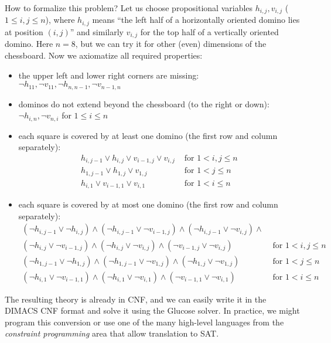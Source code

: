 How to formalize this problem? Let us choose propositional variables $h_{i,j}, v_{i,j}$ ($1 \leq i,j \leq n$), where $h_{i,j}$ means ``the left half of a horizontally oriented domino lies at position $(i,j)$'' and similarly $v_{i,j}$ for the top half of a vertically oriented domino. Here $n=8$, but we can try it for other (even) dimensions of the chessboard. Now we axiomatize all required properties:
\begin{itemize}
    \item the upper left and lower right corners are missing: $\neg h_{11}, \neg v_{11}, \neg h_{n,n-1}, \neg v_{n-1,n}$
    \item dominos do not extend beyond the chessboard (to the right or down): $\neg h_{i,n}, \neg v_{n,i}$ for $1 \leq i \leq n$
    \item each square is covered by at least one domino (the first row and column separately):
    \begin{align*}
        h_{i,j-1} \lor h_{i,j} \lor v_{i-1,j} \lor v_{i,j} &\text{ for } 1<i,j\leq n \\
        h_{1,j-1} \lor h_{1,j} \lor v_{1,j} &\text{ for } 1<j\leq n \\
        h_{i,1} \lor v_{i-1,1} \lor v_{i,1} &\text{ for } 1<i\leq n
    \end{align*}
    \item each square is covered by at most one domino (the first row and column separately):
    \begin{align*}
        (\neg h_{i,j-1} \lor \neg h_{i,j}) \land
        (\neg h_{i,j-1} \lor \neg v_{i-1,j}) \land        
        (\neg h_{i,j-1} \lor \neg v_{i,j}) \land &\\
        (\neg h_{i,j} \lor \neg v_{i-1,j}) \land
        (\neg h_{i,j} \lor \neg v_{i,j}) \land
        (\neg v_{i-1,j} \lor \neg v_{i,j}) &\text{ for } 1<i,j\leq n \\
        (\neg h_{1,j-1} \lor \neg h_{1,j}) \land (\neg h_{1,j-1} \lor \neg v_{1,j}) \land (\neg h_{1,j} \lor \neg v_{1,j}) &\text{ for } 1<j\leq n \\
        (\neg h_{i,1} \lor \neg v_{i-1,1}) \land (\neg h_{i,1} \lor \neg v_{i,1}) \land (\neg v_{i-1,1} \lor \neg v_{i,1}) &\text{ for } 1<i\leq n
    \end{align*}    
\end{itemize}

The resulting theory is already in CNF, and we can easily write it in the DIMACS CNF format and solve it using the Glucose solver. In practice, we might program this conversion or use one of the many high-level languages from the \emph{constraint programming} area that allow translation to SAT.

